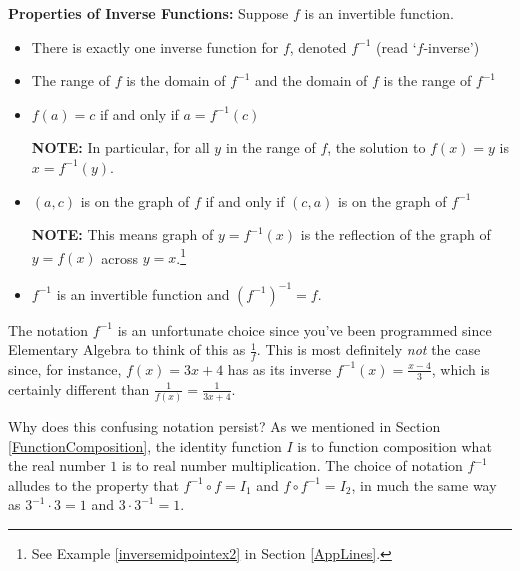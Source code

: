 \smallskip

\colorbox{ResultColor}{\bbm

\begin{thm}\textbf{Properties of Inverse Functions:} \label{inversefunctionprops} Suppose $f$ is an invertible function.  

\begin{itemize}

\item  There is exactly one inverse function for $f$, denoted $f^{-1}$ (read `$f$-inverse')

\item  The range of $f$ is the domain of $f^{-1}$ and the domain of $f$ is the range of $f^{-1}$

\item  $f(a) = c$ if and only if $a = f^{-1}(c)$

\textbf{NOTE:}  In particular,  for all $y$ in the range of $f$, the solution to $f(x) = y$ is $x = f^{-1}(y)$.

\item  $(a,c)$ is on the graph of $f$ if and only if $(c,a)$ is on the graph of $f^{-1}$

\textbf{NOTE:}  This means graph of $y=f^{-1}(x)$ is the reflection of the graph of $y=f(x)$ across  $y=x$.\footnote{See Example \ref{inversemidpointex2} in Section \ref{AppLines}.}

\item  $f^{-1}$ is an invertible function and $(f^{-1})^{-1} = f$.



\end{itemize}

\end{thm}
\ebm}

\smallskip

The notation $f^{-1}$ is an unfortunate choice since you've been programmed since Elementary Algebra to think of this as $\frac{1}{f}$.  This is most definitely \textit{not} the case since, for instance, $f(x) = 3x+4$ has as its inverse $f^{-1}(x) = \frac{x-4}{3}$, which is certainly different than $\frac{1}{f(x)} = \frac{1}{3x+4}$.  

\smallskip

Why does this confusing notation persist?  As we mentioned in Section \ref{FunctionComposition}, the identity function $I$ is to function composition what the real number $1$ is to real number multiplication.  The choice of notation $f^{-1}$ alludes to the property that $f^{-1} \circ f = I_{1}$ and $f \circ f^{-1} = I_{2}$, in much the same way as $3^{-1} \cdot 3 = 1$ and $3 \cdot 3^{-1} = 1$.  

